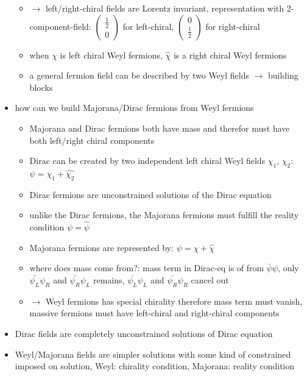 \begin{itemize}
\begin{itemize}
\item \(\rightarrow\) left/right-chiral fields are Lorentz invariant, representation with 2-component-field: \( \begin{pmatrix}\frac{1}{2} \\ 0\end{pmatrix}\) for left-chiral, \(\begin{pmatrix}0 \\ \frac{1}{2}\end{pmatrix}\) for right-chiral
\item when \(\chi\) is left chiral Weyl fermions, \( \widehat{\chi} \) is a right chiral Weyl fermions
\item a general fermion field can be described by two Weyl fields \(\rightarrow\) building blocks
\end{itemize}
\item how can we build Majorana/Dirac fermions from Weyl fermions
\begin{itemize}
\item Majorana and Dirac fermions both have mass and therefor must have both left/right chiral components
\item Dirac can be created by two independent left chiral Weyl fields \(\chi_1\), \(\chi_2\): \(\psi = \chi_1 + \widehat{\chi_2}\)
\item Dirac fermions are unconstrained solutions of the Dirac equation
\item unlike the Dirac fermions, the Majorana fermions must fulfill the reality condition \( \psi = \widehat{\psi} \)
\item Majorana fermions are represented by: \( \psi = \chi + \widehat{\chi} \)
\item where does mass come from?: mass term in Dirac-eq is of from \(\bar{\psi}\psi\), only \(\bar{\psi_L}\psi_R\) and \(\bar{\psi_R}\psi_L\) remains, \(\bar{\psi_L}\psi_L\) and \(\bar{\psi_R}\psi_R\) cancel out
\item \(\rightarrow\) Weyl fermions has special chirality therefore mass term must vanish, massive fermions must have left-chiral and right-chiral components
\end{itemize}
\item Dirac fields are completely unconstrained solutions of Dirac equation
\item Weyl/Majorana fields are simpler solutions with some kind of constrained imposed on solution, Weyl: chirality condition, Majorana: reality condition
\end{itemize}

